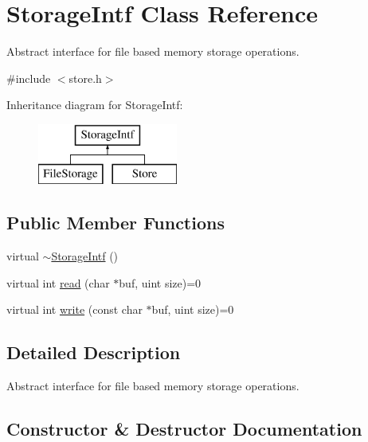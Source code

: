 \hypertarget{class_storage_intf}{}\section{Storage\+Intf Class Reference}
\label{class_storage_intf}


Abstract interface for file based memory storage operations.  




{\ttfamily \#include $<$store.\+h$>$}

Inheritance diagram for Storage\+Intf\+:\begin{figure}[H]
\begin{center}
\leavevmode
\includegraphics[height=2.000000cm]{class_storage_intf}
\end{center}
\end{figure}
\subsection*{Public Member Functions}
\begin{DoxyCompactItemize}
\item 
virtual \mbox{\hyperlink{class_storage_intf_a20aa41248a1ea20f9829cce656171bd0}{$\sim$\+Storage\+Intf}} ()
\item 
virtual int \mbox{\hyperlink{class_storage_intf_a125b99d1511364f4fe49709feec46bb4}{read}} (char $\ast$buf, uint size)=0
\item 
virtual int \mbox{\hyperlink{class_storage_intf_a97b26023c6cf0590423e428947d6febb}{write}} (const char $\ast$buf, uint size)=0
\end{DoxyCompactItemize}


\subsection{Detailed Description}
Abstract interface for file based memory storage operations. 

\subsection{Constructor \& Destructor Documentation}
\mbox{\label{class_storage_intf_a20aa41248a1ea20f9829cce656171bd0}} 
